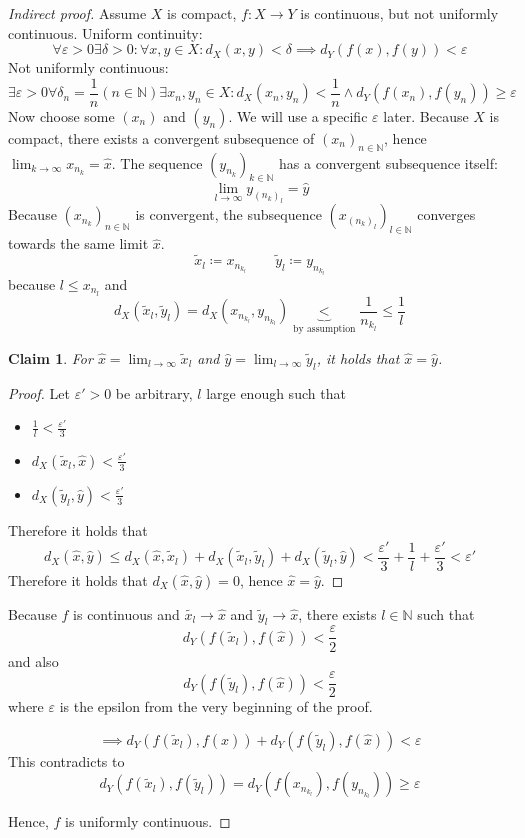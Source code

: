 \documentclass{article}
\newtheorem*{claim}{Claim}%
\begin{document}
\begin{proof}[Indirect proof]
  Assume $X$ is compact, $f: X \to Y$ is continuous, but not uniformly continuous. Uniform continuity:
  \[ \forall \varepsilon > 0 \exists \delta > 0: \forall x, y \in X: d_X(x,y) < \delta \implies d_Y(f(x), f(y)) < \varepsilon \]
  Not uniformly continuous:
  \[ \exists \varepsilon > 0 \forall \delta_n = \frac1n (n \in \mathbb N) \exists x_n, y_n \in X: d_X(x_n, y_n) < \frac1n \land d_Y(f(x_n), f(y_n)) \geq \varepsilon \]
  Now choose some $(x_n)$ and $(y_n)$. We will use a specific $\varepsilon$ later.
  Because $X$ is compact, there exists a convergent subsequence of $(x_n)_{n \in \mathbb N}$, hence $\lim_{k\to\infty} x_{n_k} = \hat{x}$.
  The sequence $(y_{n_k})_{k \in \mathbb N}$ has a convergent subsequence itself:
  \[ \lim_{l\to\infty} y_{(n_k)_l} = \hat{y} \]
  Because $(x_{n_k})_{n \in \mathbb N}$ is convergent, the subsequence $(x_{(n_k)_l})_{l \in \mathbb N}$ converges towards the same limit $\hat{x}$.
  \[ \tilde{x}_l \coloneqq x_{n_{k_l}} \qquad \tilde{y}_l \coloneqq y_{n_{k_l}} \]
  because $l \leq x_{n_l}$ and
  \[ d_X(\tilde{x}_l, \tilde{y}_l) = d_X(x_{n_{k_l}}, y_{n_{k_l}}) \underbrace{<}_{\text{by assumption}} \frac{1}{n_{k_l}} \leq \frac1l \]

  \begin{claim}
    For $\hat{x} = \lim_{l\to\infty} \tilde{x}_l$ and $\hat{y} = \lim_{l\to\infty} \tilde{y}_l$, it holds that $\hat{x} = \hat{y}$.
  \end{claim}
  \begin{proof}
    Let $\varepsilon' > 0$ be arbitrary, $l$ large enough such that
    \begin{itemize}
      \item $\frac1l < \frac{\varepsilon'}{3}$
      \item $d_X(\tilde{x}_l, \hat{x}) < \frac{\varepsilon'}{3}$
      \item $d_X(\tilde{y}_l, \hat{y}) < \frac{\varepsilon'}{3}$
    \end{itemize}
    Therefore it holds that
    \[
      d_X(\hat x, \hat y) \leq d_X(\hat x, \tilde x_l) + d_X(\tilde x_l, \tilde y_l) + d_X(\tilde y_l, \hat y)
      < \frac{\varepsilon'}{3} + \frac1l + \frac{\varepsilon'}{3} < \varepsilon'
    \]
    Therefore it holds that $d_X(\hat{x}, \hat{y}) = 0$, hence $\hat{x} = \hat{y}$.
  \end{proof}
  Because $f$ is continuous and $\tilde{x_l} \to \hat{x}$ and $\tilde{y}_l \to \hat{x}$, there exists $l \in \mathbb N$ such that
  \[ d_Y(f(\tilde x_l), f(\hat{x})) < \frac\varepsilon2 \]
  and also
  \[ d_Y(f(\tilde y_l), f(\hat{x})) < \frac\varepsilon2 \]
  where $\varepsilon$ is the epsilon from the very beginning of the proof.

  \[ \implies d_Y(f(\tilde x_l), f(\hat{x})) + d_Y(f(\tilde y_l), f(\hat{x})) < \varepsilon \]
  This contradicts to
  \[ d_Y(f(\tilde{x}_l), f(\tilde{y}_l)) = d_Y(f(x_{n_{k_l}}), f(y_{n_{k_l}})) \geq \varepsilon \]

  Hence, $f$ is uniformly continuous.
\end{proof}
\end{document}

